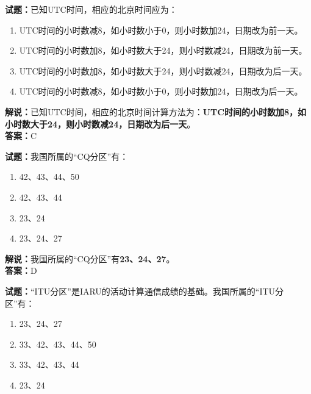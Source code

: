 \documentclass{ctexbook}
\begin{document}
\noindent\textbf{试题：}已知UTC时间，相应的北京时间应为：

\begin{enumerate}[leftmargin=3em]
  \item UTC时间的小时数减8，如小时数小于0，则小时数加24，日期改为前一天。
  \item UTC时间的小时数加8，如小时数大于24，则小时数减24，日期改为前一天。
  \item UTC时间的小时数加8，如小时数大于24，则小时数减24，日期改为后一天。
  \item UTC时间的小时数减8，如小时数小于0，则小时数加24，日期改为后一天。
\end{enumerate}

\noindent\textbf{解说：}已知UTC时间，相应的北京时间计算方法为：\textbf{UTC时间的小时数加8，如小时数大于24，则小时数减24，日期改为后一天}。\\\noindent\textbf{答案：}C

\vspace{\baselineskip}

\noindent\textbf{试题：}我国所属的“CQ分区”有：

\begin{enumerate}[leftmargin=3em]
  \item 42、43、44、50
  \item 42、43、44
  \item 23、24
  \item 23、24、27
\end{enumerate}

\noindent\textbf{解说：}我国所属的“CQ分区”有\textbf{23、24、27}。\\\noindent\textbf{答案：}D

\vspace{\baselineskip}

\noindent\textbf{试题：}“ITU分区”是IARU的活动计算通信成绩的基础。我国所属的“ITU分区”有：

\begin{enumerate}[leftmargin=3em]
  \item 23、24、27
  \item 33、42、43、44、50
  \item 33、42、43、44
  \item 23、24
\end{enumerate}
\end{document}
